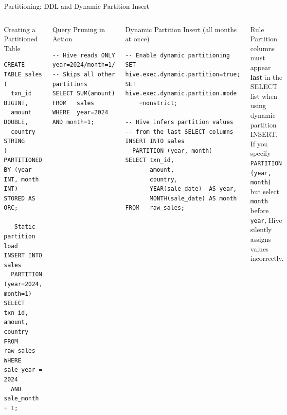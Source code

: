 \documentclass[aspectratio=169,10pt]{beamer}
\begin{document}
\begin{frame}[fragile]{Partitioning: DDL and Dynamic Partition Insert}
  \begin{columns}[T]
      \begin{exampleblock}{Creating a Partitioned Table}
        \begin{lstlisting}
CREATE TABLE sales (
  txn_id  BIGINT,
  amount  DOUBLE,
  country STRING
)
PARTITIONED BY (year INT, month INT)
STORED AS ORC;

-- Static partition load
INSERT INTO sales
  PARTITION (year=2024, month=1)
SELECT txn_id, amount, country
FROM   raw_sales
WHERE  sale_year = 2024
  AND  sale_month = 1;
        \end{lstlisting}
      \end{exampleblock}
      \vspace{4pt}
      \begin{block}{Query Pruning in Action}
        \begin{lstlisting}
-- Hive reads ONLY year=2024/month=1/
-- Skips all other partitions
SELECT SUM(amount)
FROM   sales
WHERE  year=2024 AND month=1;
        \end{lstlisting}
      \end{block}

      \begin{exampleblock}{Dynamic Partition Insert (all months at once)}
        \begin{lstlisting}
-- Enable dynamic partitioning
SET hive.exec.dynamic.partition=true;
SET hive.exec.dynamic.partition.mode
    =nonstrict;

-- Hive infers partition values
-- from the last SELECT columns
INSERT INTO sales
  PARTITION (year, month)
SELECT txn_id,
       amount,
       country,
       YEAR(sale_date)  AS year,
       MONTH(sale_date) AS month
FROM   raw_sales;
        \end{lstlisting}
      \end{exampleblock}
      \vspace{4pt}
      \begin{alertblock}{Rule}
        \small Partition columns must appear \textbf{last} in the SELECT list when using dynamic partition INSERT.  If you specify \texttt{PARTITION (year, month)} but select \texttt{month} before \texttt{year}, Hive silently assigns values incorrectly.
      \end{alertblock}
  \end{columns}
\end{frame}
\end{document}
